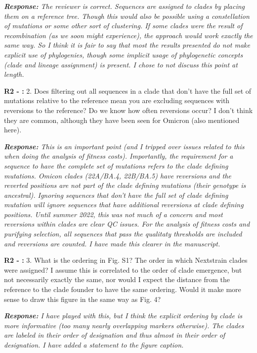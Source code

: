 \documentclass[aps,rmp,onecolumn]{revtex4-1}
\newcounter{counter1}[section]
\newcounter{counter2}[section]
\newcounter{counter3}[section]
\newcommand{\refb}[1]{\vskip 5mm \textbf{R2 - \stepcounter{counter2}\arabic{counter2}:} #1}
\newcommand{\response}[1]{{\it {\color{response}\textbf{Response:} #1}}\vskip 5mm}
\begin{document}
\response{The reviewer is correct. Sequences are assigned to clades by placing them on a reference tree.
Though this would also be possible using a constellation of mutations or some other sort of clustering. If some clades were the result of recombination (as we soon might experience), the approach would work exactly the same way. So I think it is fair to say that most the results presented do not make explicit use of phylogenies, though some implicit usage of phylogenetic concepts (clade and lineage assignment) is present. I chose to not discuss this point at length.  }

\refb{2. Does filtering out all sequences in a clade that don't have the full set of mutations relative to the reference mean you are excluding sequences with reversions to the reference? Do we know how often reversions occur? I don't think they are common, although they have been seen for Omicron (also mentioned here).}

\response{This is an important point (and I tripped over issues related to this when doing the analysis of fitness costs). Importantly, the requirement for a sequence to have the complete set of mutations refers to the clade defining mutations. Omicon clades (22A/BA.4, 22B/BA.5) have reversions and the reverted positions are not part of the clade defining mutations (their genotype is ancestral). Ignoring sequences that don't have the full set of clade defining mutation will ignore sequences that have additional reversions at clade defining positions. Until summer 2022, this was not much of a concern and most reversions within clades are clear QC issues. For the analysis of fitness costs and purifying selection, all sequences that pass the qualitaty thresholds are included and reversions are counted.
I have made this clearer in the manuscript.}

\refb{3. What is the ordering in Fig. S1? The order in which Nextstrain clades were assigned? I assume this is correlated to the order of clade emergence, but not necessarily exactly the same, nor would I expect the distance from the reference to the clade founder to have the same ordering. Would it make more sense to draw this figure in the same way as Fig. 4?}

\response{I have played with this, but I think the explicit ordering by clade is more informative (too many nearly overlapping markers otherwise). The clades are labeled in their order of designation and thus almost in their order of designation. I have added a statement to the figure caption. }
\end{document}
